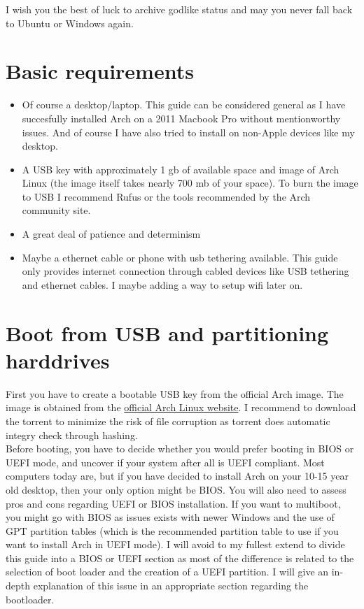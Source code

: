 \documentclass{article}
\begin{document}
	I wish you the best of luck to archive godlike status and may you never fall back to Ubuntu or Windows again.
	
	\pagebreak
	\pagebreak
	
	\section{Basic requirements}
	
	\begin{itemize}
		\item Of course a desktop/laptop. This guide can be considered general as I have succesfully installed Arch on a 2011 Macbook Pro without mentionworthy issues. And of course I have also tried to install on non-Apple devices like my desktop.
		\item A USB key with approximately 1 gb of available space and image of Arch Linux (the image itself takes nearly 700 mb of your space). To burn the image to USB I recommend Rufus or the tools recommended by the Arch community site. 
		\item A great deal of patience and determinism
		\item Maybe a ethernet cable or phone with usb tethering available. This guide only provides internet connection through cabled devices like USB tethering and ethernet cables. I maybe adding a way to setup wifi later on.
		
	\end{itemize}
	\section{Boot from USB and partitioning harddrives}
	
	First you have to create a bootable USB key from the official Arch image. The image is obtained from the \href{https://www.archlinux.org/download/}{official Arch Linux website}. I recommend to download the torrent to minimize the risk of file corruption as torrent does automatic integry check through hashing.\\
	
	Before booting, you have to decide whether you would prefer booting in BIOS or UEFI mode, and uncover if your system after all is UEFI compliant. Most computers today are, but if you have decided to install Arch on your 10-15 year old desktop, then your only option might be BIOS. You will also need to assess pros and cons regarding UEFI or BIOS installation. If you want to multiboot, you might go with BIOS as issues exists with newer Windows and the use of GPT partition tables (which is the recommended partition table to use if you want to install Arch in UEFI mode). I will avoid to my fullest extend to divide this guide into a BIOS or UEFI section as most of the difference is related to the selection of boot loader and the creation of a UEFI partition. I will give an in-depth explanation of this issue in an appropriate section regarding the bootloader.\\
	
\end{document}
